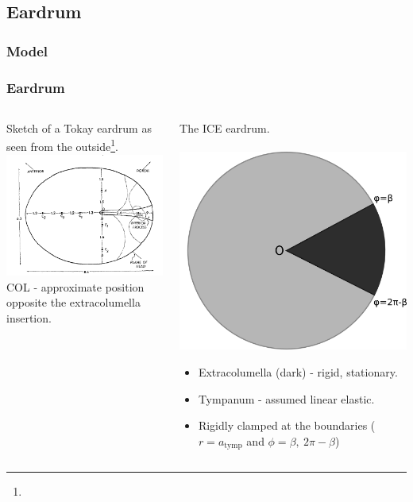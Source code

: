 \documentclass{beamer}
\let\oldfootnotesize\footnotesize
\renewcommand*{\footnotesize}{\oldfootnotesize\tiny}
\begin{document}
\subsection{Eardrum}
\subsubsection{Model}
\begin{frame}[t]
\frametitle{Eardrum}
\begin{columns}
    \begin{column}{0.5\textwidth}
      \centering
      \small
      Sketch of a Tokay eardrum as seen from the outside\footnote{}.\\
      \includegraphics[width = 3.7 cm]{Diagrams/geckoear.png}\\
      \footnotesize
     COL - approximate position opposite the extracolumella insertion.
    \end{column}

    \begin{column}{0.5\textwidth}
      \centering
      \small
      The ICE eardrum.\\
      \textbf{}\\
      \includegraphics[width = 3.2 cm]{Diagrams/tympanummodel.png}\\
\footnotesize
\begin{itemize}
      \item[] Extracolumella (dark) - rigid, stationary.
      \item[] Tympanum - assumed linear elastic.
      \item[] Rigidly clamped at the boundaries ($r=a_{\mathrm{tymp}}$ and $\phi=\beta,\ 2\pi-\beta$)
\end{itemize}

    \end{column}
  \end{columns}
  
\end{frame}
\end{document}
